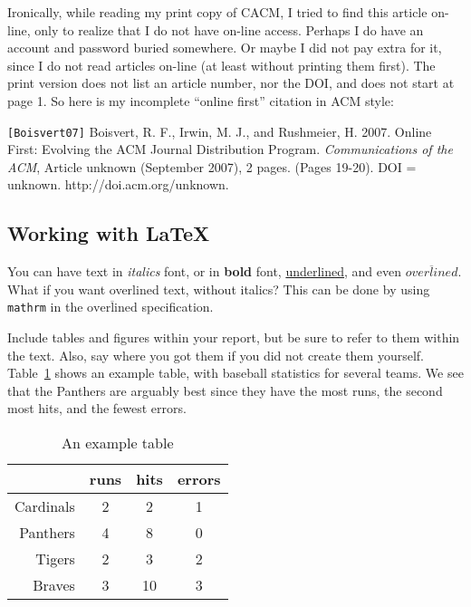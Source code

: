 \documentclass[final]{ieee}
\begin{document}
Ironically, while reading my print copy of CACM, I tried to find this
article on-line, only to realize that I do not have on-line access.
Perhaps I do have an account and password buried somewhere. Or maybe I
did not pay extra for it, since I do not read articles on-line (at least
without printing them first). The print version does not list an article
number, nor the DOI, and does not start at page 1. So here is my
incomplete ``online first'' citation in ACM style:

\verb"[Boisvert07]" Boisvert, R. F., Irwin, M. J., and Rushmeier, H. 2007.
Online First: Evolving the ACM Journal Distribution Program.
{\it Communications of the ACM}, Article unknown (September 2007), 2 pages.
(Pages 19-20). DOI = unknown. http://doi.acm.org/unknown.




\subsection{Working with \LaTeX}
You can have text in {\it italics} font, or in {\bf bold} font,
\underline{underlined}, and even $\overline{overlined}$.
What if you want overlined text, without italics? This can
be done by using \verb"mathrm" in the 
$\overline{\mathrm{overlined}}$ specification.

Include tables and figures within your report, but be sure to 
refer to them within the text. Also, say where you got them
if you did not create them yourself. Table~\ref{tab:example_tab}
shows an example table, with baseball statistics for several
teams. We see that the Panthers are arguably best since they
have the most runs, the second most hits, and the fewest errors.

\begin{table}[!hbt]
\begin{center}
  \begin{tabular}{|r|c|c|c|}
     \hline
 & runs & hits & errors  \\
     \hline
Cardinals  & 2 & 2 & 1  \\
Panthers & 4 & 8 & 0  \\
Tigers  & 2 & 3 & 2  \\
Braves  & 3 & 10 & 3  \\
     \hline
  \end{tabular}
  \caption{An example table}
  \label{tab:example_tab}
\end{center}
\end{table}
\end{document}
